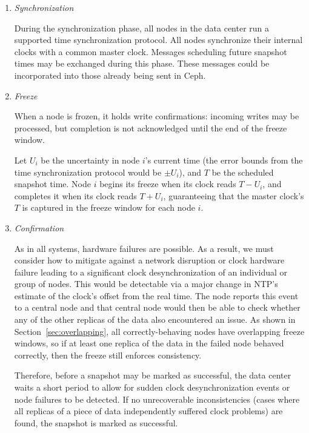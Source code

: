 \begin{enumerate}

\item \emph{Synchronization}

  During the synchronization phase, all nodes in the data center run a
  supported time synchronization protocol. All nodes synchronize
  their internal clocks with a common master
  clock\footnotemark. Messages scheduling future snapshot times may be
  exchanged during this phase. These messages could be incorporated
  into those already being sent in Ceph.


\item \emph{Freeze}
 
 When a node is frozen, it holds write confirmations: incoming writes
 may be processed, but completion is not acknowledged until the end
 of the freeze window.
 
 Let $U_i$ be the uncertainty in node $i$'s current time (the error
 bounds from the time synchronization protocol would be $\pm U_i$), and
 $T$ be the scheduled snapshot time. Node $i$ begins its freeze when
 its clock reads $T - U_i$, and completes it when its clock reads
 $T + U_i$, guaranteeing that the master clock's $T$ is captured in
 the freeze window for each node $i$.

\item \emph{Confirmation}

  As in all systems, hardware failures are possible. As a result, we
  must consider how to mitigate against a network disruption or clock
  hardware failure leading to a significant clock desynchronization of
  an individual or group of nodes. This would be detectable via a
  major change in NTP's estimate of the clock's offset from the real
  time. The node reports this event to a central node and that central
  node would then be able to check whether any of the other replicas
  of the data also encountered an issue. As shown in
  Section~\ref{sec:overlapping}, all correctly-behaving nodes have
  overlapping freeze windows, so if at least one replica of the data
  in the failed node behaved correctly, then the freeze still enforces
  consistency.
 
  Therefore, before a snapshot may be marked as successful, the data
  center waits a short period to allow for sudden clock
  desynchronization events or node failures to be detected. If no
  unrecoverable inconsistencies (cases where all replicas of a piece
  of data independently suffered clock problems) are found, the
  snapshot is marked as successful.


\end{enumerate}

